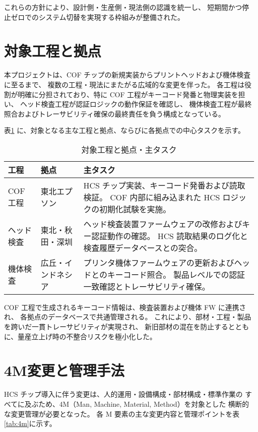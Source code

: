 \documentclass[journal,twocolumn]{IEEEtran}
\begin{document}
これらの方針により、設計側・生産側・現法側の認識を統一し、
短期間かつ停止ゼロでのシステム切替を実現する枠組みが整備された。

\section{対象工程と拠点}

本プロジェクトは、COF チップの新規実装からプリントヘッドおよび機体検査に至るまで、
複数の工程・現法にまたがる広域的な変更を伴った。
各工程は役割が明確に分担されており、特に COF 工程がキーコード発番と物理実装を担い、
ヘッド検査工程が認証ロジックの動作保証を確認し、
機体検査工程が最終照合およびトレーサビリティ確保の最終責任を負う構成となっている。

表\ref{tab:sitemap} に、対象となる主な工程と拠点、ならびに各拠点での中心タスクを示す。

\begin{table}[t]
\caption{対象工程と拠点・主タスク}
\label{tab:sitemap}
\centering
\begin{tabularx}{\columnwidth}{@{}l l X@{}}
\toprule
工程 & 拠点 & 主タスク \\
\midrule
COF工程 & 東北エプソン &
HCS チップ実装、キーコード発番および読取検証。
COF 内部に組み込まれた HCS ロジックの初期化試験を実施。 \\[2pt]
ヘッド検査 & 東北・秋田・深圳 &
ヘッド検査装置ファームウェアの改修およびキー認証動作の確認。
HCS 読取結果のログ化と検査履歴データベースとの突合。 \\[2pt]
機体検査 & 広丘・インドネシア &
プリンタ機体ファームウェアの更新およびヘッドとのキーコード照合。
製品レベルでの認証一致確認とトレーサビリティ確保。 \\
\bottomrule
\end{tabularx}
\end{table}

COF 工程で生成されるキーコード情報は、検査装置および機体 FW に連携され、
各拠点のデータベースで共通管理される。
これにより、部材・工程・製品を跨いだ一貫トレーサビリティが実現され、
新旧部材の混在を防止するとともに、量産立上げ時の不整合リスクを極小化した。

\section{4M変更と管理手法}

HCS チップ導入に伴う変更は、人的運用・設備構成・部材構成・標準作業の
すべてに及ぶため、4M（Man, Machine, Material, Method）を対象とした
横断的な変更管理が必要となった。
各 M 要素の主な変更内容と管理ポイントを表\ref{tab:4m}に示す。
\end{document}
